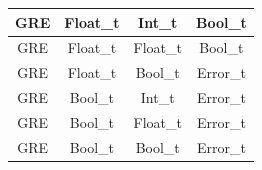 \begin{figure}[H]
\begin{tabular}{cccc}
        \midrule GRE & Float\_t & Int\_t    & Bool\_t \\
        \midrule GRE & Float\_t & Float\_t  & Bool\_t \\
        \midrule GRE & Float\_t & Bool\_t   & Error\_t \\

        \midrule GRE & Bool\_t & Int\_t     & Error\_t \\
        \midrule GRE & Bool\_t & Float\_t   & Error\_t \\
        \midrule GRE & Bool\_t & Bool\_t    & Error\_t \\

        \bottomrule
    \end{tabular}\\
\end{figure}

\newpage

